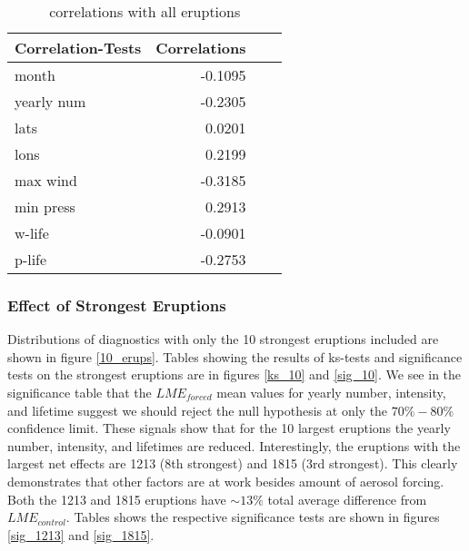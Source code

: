 \documentclass[smallextended]{svjour3}       %
\begin{document}
\begin{table}[!tbp]
\centering
\begin{tabular}{lrrr}
\toprule
             Correlation-Tests &     Correlations \\
\midrule

month & -0.1095 \\
yearly num & -0.2305 \\
lats & 0.0201 \\
lons & 0.2199 \\
max wind & -0.3185 \\
min press & 0.2913 \\
w-life & -0.0901 \\
p-life & -0.2753 \\

\bottomrule
\end{tabular}
\caption{correlations with all eruptions}
\label{corr_all}
\end{table}

\subsubsection{Effect of Strongest Eruptions}
Distributions of diagnostics with only the 10 strongest eruptions included are shown in figure \ref{10_erups}. Tables showing the results of ks-tests and significance tests on the strongest eruptions are in figures \ref{ks_10} and \ref{sig_10}. We see in the significance table that the $LME_{forced}$ mean values for yearly number, intensity, and lifetime suggest we should reject the null hypothesis at only the $70\%-80\%$ confidence limit. These signals show that for the 10 largest eruptions the yearly number, intensity, and lifetimes are reduced. Interestingly, the eruptions with the largest net effects are 1213 (8th strongest) and 1815 (3rd strongest). This clearly demonstrates that other factors are at work besides amount of aerosol forcing. Both the 1213 and 1815 eruptions have ${\sim}13\%$ total average difference from $LME_{control}$. Tables shows the respective significance tests are shown in figures \ref{sig_1213} and \ref{sig_1815}.   
\end{document}
